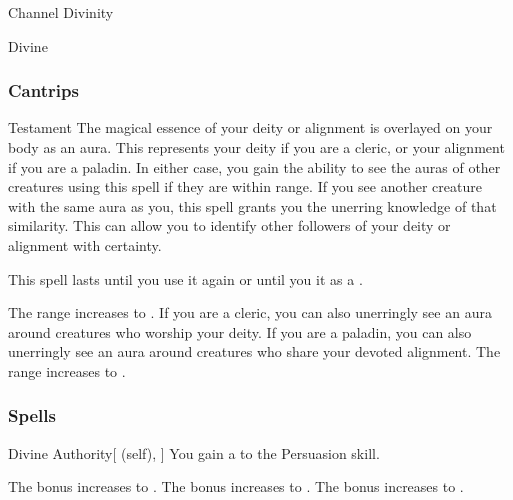 \newpage
\begin{spellsection}{Channel Divinity}

\begin{spellheader}
\end{spellheader}


 Divine

\subsubsection{Cantrips}


\begin{freeability}{Testament}
The magical essence of your deity or alignment is overlayed on your body as an aura.
This represents your deity if you are a cleric, or your alignment if you are a paladin.
In either case, you gain the ability to see the auras of other creatures using this spell if they are within \rngclose range.
If you see another creature with the same aura as you, this spell grants you the unerring knowledge of that similarity.
This can allow you to identify other followers of your deity or alignment with certainty.

This spell lasts until you use it again or until you  it as a .

\rankline
{} The range increases to \rngmed.
 If you are a cleric, you can also unerringly see an aura around creatures who worship your deity.
If you are a paladin, you can also unerringly see an aura around creatures who share your devoted alignment.
 The range increases to \rngext.
\end{freeability}

\end{spellsection}


\subsubsection{Spells}


\lowercase{\hypertarget{spell:Divine Authority}{}}\label{spell:Divine Authority}
\begin{attuneability}[Rank 1]{\hypertarget{spell:Divine Authority}{Divine Authority}}[ (self), ]
You gain a   to the Persuasion skill.

\rankline
{} The bonus increases to .
 The bonus increases to .
 The bonus increases to .

\end{attuneability}
\vspace{0.25em}




